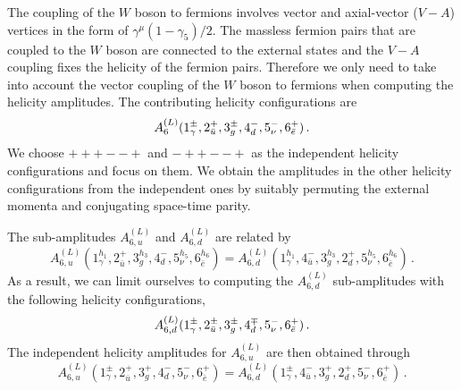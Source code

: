 \documentclass[main.tex]{subfiles}
\begin{document}
The coupling of the $W$ boson to fermions involves vector and axial-vector ($V-A$) vertices in the form of $\gamma^\mu(1-\gamma_5)/2$.
The massless fermion pairs that are coupled to the $W$ boson are connected to the external states and the $V-A$ coupling fixes the helicity of the fermion pairs. Therefore we only need to take into account the vector coupling of the $W$ boson to fermions when computing the helicity amplitudes. The contributing helicity configurations are 
\begin{equation}
A_{6}^{(L)}(1^\pm_\gamma,2^+_{\bar{u}},3^\pm_g,4^-_d,5^-_{\nu},6^+_{\bar{e}}) \,. 
\nonumber \\ 
\end{equation}
We choose $\scriptstyle +++--+$ and $\scriptstyle -++--+$ as the independent helicity configurations and focus on them. We obtain the amplitudes in the other helicity configurations from the independent ones by suitably permuting the external momenta and conjugating space-time parity.

The sub-amplitudes $A^{(L)}_{6,u}$ and $A^{(L)}_{6,d}$ are related by
\begin{equation}  \label{Wyjeq:ufromd}
A_{6,u}^{(L)}(1^{h_1}_\gamma,2^+_{\bar{u}},3^{h_3}_g,4^-_d,5^{h_5}_{\nu},6^{h_6}_{\bar{e}})
=
A_{6,d}^{(L)}(1^{h_1}_\gamma,4^-_{\bar{u}},3^{h_3}_g,2^+_d,5^{h_5}_{\nu},6^{h_6}_{\bar{e}}) \,.
\end{equation}
As a result, we can limit ourselves to computing the $A^{(L)}_{6,d}$ sub-amplitudes with the following helicity configurations,
\begin{equation}
A_{6,d}^{(L)}(1^\pm_\gamma,2^\pm_{\bar{u}},3^\pm_g,4^\mp_d,5^-_{\nu},6^+_{\bar{e}})\,.
\nonumber \\ 
\end{equation}
The independent helicity amplitudes for $A^{(L)}_{6,u}$ are then obtained through
\begin{equation}
A_{6,u}^{(L)}(1^\pm_\gamma,2^+_{\bar{u}},3^+_g,4^-_d,5^-_{\nu},6^+_{\bar{e}})
=
A_{6,d}^{(L)}(1^\pm_\gamma,4^-_{\bar{u}},3^+_g,2^+_d,5^-_{\nu},6^+_{\bar{e}}) \,.
\end{equation}
\end{document}
